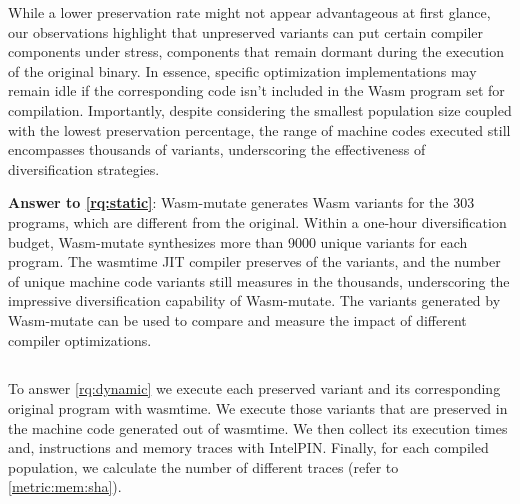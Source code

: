 \documentclass[sigplan,screen]{acmart}
\newcommand{\tool}{Wasm-mutate\xspace}
\newcommand{\wasm}{Wasm\xspace}
\begin{document}
While a lower preservation rate might not appear advantageous at first glance, our observations highlight that unpreserved variants can put certain compiler components under stress, components that remain dormant during the execution of the original binary. 
In essence, specific optimization implementations may remain idle if the corresponding code isn't included in the \wasm program set for compilation. 
Importantly, despite considering the smallest population size coupled with the lowest preservation percentage, the range of machine codes executed still encompasses thousands of variants, underscoring the effectiveness of diversification strategies.






\begin{tcolorbox}[boxrule=1pt,arc=.3em,boxsep=-1.3mm]
  \textbf{Answer to \ref{rq:static}}: \tool generates \wasm variants for the 303 programs, which are different from the original. 
  Within a one-hour diversification budget, \tool synthesizes more than 9000 unique  variants for each program. 
  The wasmtime JIT compiler preserves \preserved of the variants, and the number of unique machine code variants still measures in the thousands, underscoring the impressive diversification capability of \tool.
  The variants generated by \tool can be used to compare and measure the impact of different compiler optimizations.
\end{tcolorbox}


\subsection{\rqdynamic}

To answer \ref{rq:dynamic} we execute each preserved variant and its corresponding original program with wasmtime.
We execute those variants that are preserved in the machine code generated out of wasmtime.
We then collect its execution times and, instructions and memory traces with IntelPIN.
Finally, for each compiled population, we calculate the number of different traces (refer to \autoref{metric:mem:sha}).
\end{document}
